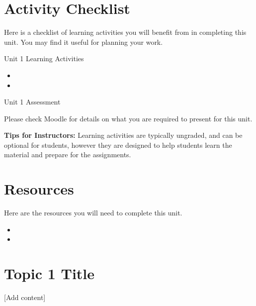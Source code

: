 \documentclass[
]{book}
\providecommand{\tightlist}{%
  \setlength{\itemsep}{0pt}\setlength{\parskip}{0pt}}
\begin{document}
\hypertarget{activity-checklist-2}{%
\section*{Activity Checklist}\label{activity-checklist-2}}

Here is a checklist of learning activities you will benefit from in completing this unit. You may find it useful for planning your work.

\begin{reflect}
{Unit 1 Learning Activities }

\begin{itemize}
\tightlist
\item
\item
\end{itemize}
\end{reflect}

\begin{assessment}
{Unit 1 Assessment}

Please check Moodle for details on what you are required to present for this unit.
\end{assessment}

\begin{feedback}
\textbf{Tips for Instructors:}
Learning activities are typically ungraded, and can be optional for students, however they are designed to help students learn the material and prepare for the assignments.
\end{feedback}

\hypertarget{resources-4}{%
\section*{Resources}\label{resources-4}}

Here are the resources you will need to complete this unit.

\begin{itemize}
\tightlist
\item
\item
\end{itemize}

\hypertarget{topic-1-title}{%
\section{Topic 1 Title}\label{topic-1-title}}

{[}Add content{]}
\end{document}
